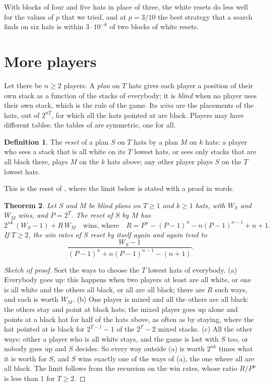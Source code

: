 \documentclass[11pt,a4paper]{article}
\newtheorem{theorem}{Theorem}
\theoremstyle{definition}
\newtheorem{definition}[theorem]{Definition}
\theoremstyle{remark}
\begin{document}
With blocks of four and five hats in place of three, the white resets do
less well for the values of $p$ that we tried, and at $p = 3/10$ the
best strategy that a search finds on six hats is within $3\cdot 10^{-6}$
of two blocks of white resets.

\section{More players}\label{sec:players}

Let there be $n \ge 2$ players. A \emph{plan} on $T$ hats gives each
player a position of their own stack as a function of the stacks of
everybody; it is \emph{blind} when no player uses their own stack, which
is the rule of the game. Its \emph{wins} are the placements of the hats,
out of $2^{nT}$, for which all the hats pointed at are black. Players may
have different tables; the tables of \cite{BFG} are symmetric, one for
all.

\begin{definition}
The \emph{reset} of a plan $S$ on $T$ hats by a plan $M$ on $k$ hats: a
player who sees a stack that is all white on its $T$ lowest hats, or
sees only stacks that are all black there, plays $M$ on the $k$ hats
above; any other player plays $S$ on the $T$ lowest hats.
\end{definition}

This is the reset of \cite{BFG}, where the limit below is stated with a
proof in words.

\begin{theorem}\label{thm:reset}
Let $S$ and $M$ be blind plans on $T \ge 1$ and $k \ge 1$ hats, with
$W_S$ and $W_M$ wins, and $P = 2^T$. The reset of $S$ by $M$ has
\[
  2^{nk}\,(W_S - 1) + R\,W_M
  \quad\text{wins, where}\quad
  R = P^n - (P-1)^n - n(P-1)^{n-1} + n + 1 .
\]
If $T \ge 2$, the win rates of $S$ reset by itself again and again tend
to
\[
  \frac{W_S - 1}{(P-1)^n + n(P-1)^{n-1} - (n+1)} .
\]
\end{theorem}

\begin{proof}[Sketch of proof]
Sort the ways to choose the $T$ lowest hats of everybody. (a) Everybody
goes up: this happens when two players at least are all white, or one is
all white and the others all black, or all are all black; there are $R$
such ways, and each is worth $W_M$. (b) One player is mixed and all the
others are all black: the others stay and point at black hats; the mixed
player goes up alone and points at a black hat for half of the hats
above, as often as by staying, where the hat pointed at is black for
$2^{T-1}-1$ of the $2^T - 2$ mixed stacks. (c) All the other ways:
either a player who is all white stays, and the game is lost with $S$
too, or nobody goes up and $S$ decides. So every way outside (a) is
worth $2^{nk}$ times what it is worth for $S$, and $S$ wins exactly one
of the ways of (a), the one where all are all black. The limit follows
from the recursion on the win rates, whose ratio $R/P^n$ is less than
$1$ for $T \ge 2$.
\end{proof}
\end{document}
